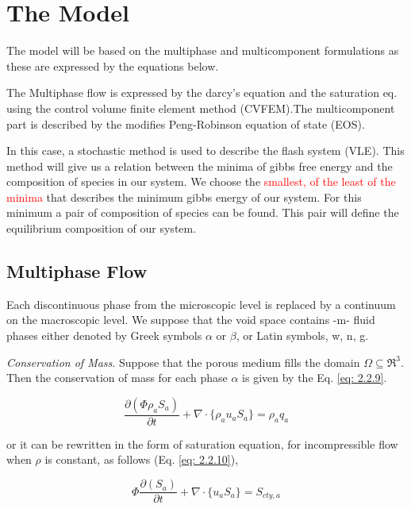 \documentclass[12pt,a4paper,oneside]{report}%
\begin{document}
\chapter{The Model}

The model will be based on the multiphase and multicomponent formulations as these are expressed by the equations below. 

The Multiphase flow is expressed by the darcy's equation and the saturation eq. using the control volume finite element method (CVFEM).The multicomponent part is described by the modifies Peng-Robinson equation of state (EOS). 

In this case, a stochastic method is used to describe the flash system (VLE). This method will give us a relation between the minima of gibbs free energy and the composition of species in our system. We choose the \textcolor{red}{smallest, of the least of the minima} that describes the minimum gibbs energy of our system. For this minimum a pair of composition of species can be found. This pair will define the equilibrium composition of our system.  
 
\section{Multiphase Flow}

Each discontinuous phase from the microscopic level is replaced by a continuum on the macroscopic level. We suppose that the void space contains -m- fluid phases either denoted by Greek symbols $\alpha$ or $\beta$, or Latin symbols, w, n, g.

\textit{Conservation of Mass}. Suppose that the porous medium fills the domain $\Omega \subseteq \Re^3$. Then the conservation of mass for  each phase $\alpha$ is given by the Eq. \ref{eq: 2.2.9}.  

\begin{equation}
 \frac{\partial( \Phi \rho_a S_a)}{\partial t} + \nabla \cdot \{\rho_a u_a S_a\} = \rho_a q_a 
\label{eq: 2.2.9}
\end{equation}  

\noindent or it can be rewritten in the form of saturation equation, for incompressible flow when $\rho$ is constant, as follows (Eq. \ref{eq: 2.2.10}), 

\begin{equation}
\Phi \frac{\partial(S_a)}{\partial t} + \nabla \cdot \{u_a S_a \} = S_{cty,a} 
\label{eq: 2.2.10}
\end{equation}  
\end{document}

